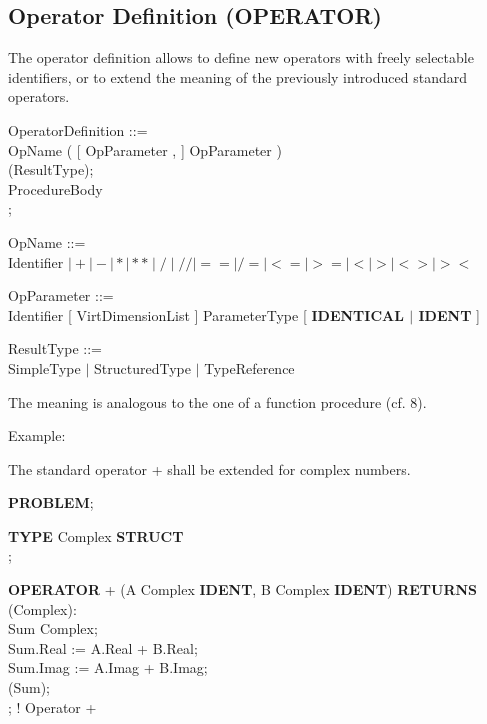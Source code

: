 \begin{removed}
\section{Operator Definition (OPERATOR)}   %

The operator definition allows to define new operators with freely
selectable identifiers, or to extend the meaning of the previously
introduced standard operators.

\begin{front}
OperatorDefinition ::=\\
 OpName ( [ OpParameter , ] OpParameter )\\
 (ResultType);\\
\x ProcedureBody\\
;

OpName ::=\\
\x Identifier $\mid + \mid - \mid * \mid ** \mid / \mid // \mid == \mid /= \mid <= \mid >= \mid < \mid > \mid <> \mid ><$

OpParameter ::=\\
\x Identifier [ VirtDimensionList ] ParameterType [ {\bf IDENTICAL $\mid$ IDENT} ]

ResultType ::=\\
\x SimpleType $\mid$ StructuredType $\mid$ TypeReference
\end{front}
\begin{grammar}



\end{grammar}

The meaning is analogous to the one of a function procedure (cf. 8).


Example:

The standard operator + shall be extended for complex numbers.

{\bf PROBLEM};

{\bf TYPE} Complex {\bf STRUCT}\\
;

{\bf OPERATOR} + (A Complex {\bf IDENT}, B Complex {\bf IDENT}) {\bf RETURNS} (Complex):\\
 Sum Complex;\\
\x Sum.Real := A.Real + B.Real;\\
\x Sum.Imag := A.Imag + B.Imag;\\
 (Sum);\\
; ! Operator +


\end{removed}
